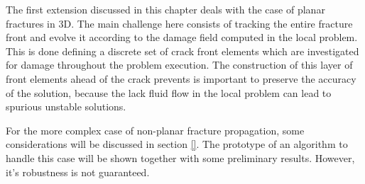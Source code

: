 The first extension discussed in this chapter deals with the case of planar fractures in 3D. The main challenge here consists of tracking the entire fracture front and evolve it according to the damage field computed in the local problem. This is done defining a discrete set of crack front elements which are investigated for damage throughout the problem execution. The construction of this layer of front elements ahead of the crack prevents is important to preserve the accuracy of the solution, because the lack fluid flow in the local problem can lead to spurious unstable solutions.

For the more complex case of non-planar fracture propagation, some considerations will be discussed in section \ref{}. The prototype of an algorithm to handle this case will be shown together with some preliminary results. However, it's robustness is not guaranteed. 

